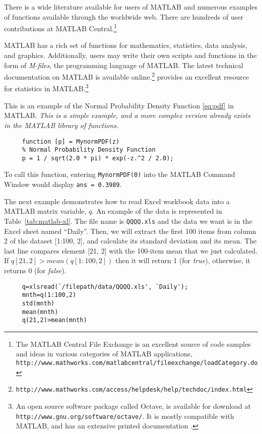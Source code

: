 There is a wide literature available for users of MATLAB and numerous examples of functions available through the worldwide web. There are hundreds of user contributions at MATLAB Central.\footnote{The MATLAB Central File Exchange is an excellent source of code samples and ideas in various categories of MATLAB applications, \\ \texttt{http://www.mathworks.com/matlabcentral/fileexchange/loadCategory.do}}

MATLAB has a rich set of functions for mathematics, statistics, data analysis, and graphics. Additionally, users may write their own scripts and functions in the form of \emph{M-files}, the programming language of MATLAB. 
The latest technical documentation on MATLAB is available online.\footnote{\texttt{http://www.mathworks.com/access/helpdesk/help/techdoc/index.html}}  provides an excellent resource for statistics in MATLAB.\footnote{An open source software package called Octave, is available for download at \texttt{http://www.gnu.org/software/octave/}. It is mostly compatible with MATLAB, and has an extensive printed documentation \cite{eaton:2008}.}

This is an example of the Normal Probability Density Function \eqref{eq:pdf} in \textsc{MATLAB}. \emph{This is a simple example, and a more complex version already exists in the MATLAB library of functions.}
\begin{verbatim}
     function [p] = MynormPDF(z)
     % Normal Probability Density Function
     p = 1 / sqrt(2.0 * pi) * exp(-z.^2 / 2.0);
\end{verbatim}
To call this function, entering \texttt{MynormPDF(0)} into the MATLAB Command Window would display \texttt{ans =  0.3989}.

The next example demonstrates how to read Excel workbook data into a MATLAB matrix variable, $q$. An example of the data is represented in Table~\ref{tab:matlab-xl}. The file name is \texttt{QQQQ.xls} and the data we want is in the Excel sheet named ``Daily''. Then, we will extract the first 100 items from column 2 of the dataset [1:100, 2], and calculate its standard deviation and its mean. The last line compares element [21, 2] with the 100-item mean that we just calculated. If $q[21,2]>mean(q[1:100,2])$ then it will return 1 (for \emph{true}), otherwise, it returns 0 (for \emph{false}).
\begin{verbatim}
     q=xlsread(`/filepath/data/QQQQ.xls', `Daily');
     mnth=q(1:100,2)
     std(mnth)
     mean(mnth)
     q(21,2)>mean(mnth)
\end{verbatim}

